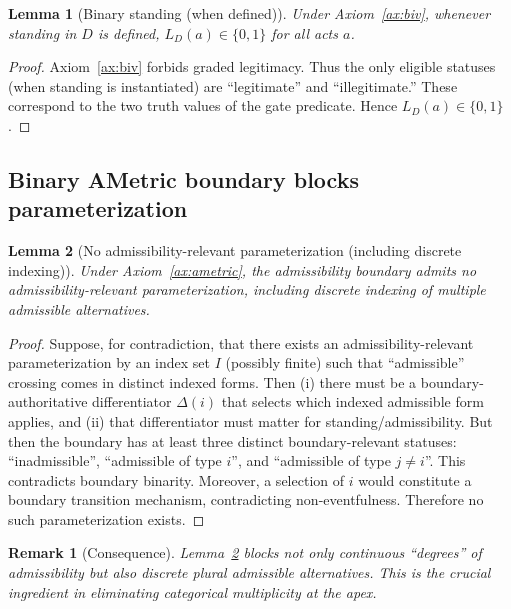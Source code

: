 \documentclass[12pt]{article}
\newtheorem{lemma}{Lemma}
\newtheorem{remark}{Remark}
\begin{document}
\begin{lemma}[Binary standing (when defined)]
\label{lem:binary-standing}
Under Axiom~\ref{ax:biv}, whenever standing in $D$ is defined, $L_D(a)\in\{0,1\}$ for all acts $a$.
\end{lemma}

\begin{proof}
Axiom~\ref{ax:biv} forbids graded legitimacy. Thus the only eligible statuses (when standing is instantiated) are ``legitimate'' and ``illegitimate.''
These correspond to the two truth values of the gate predicate. Hence $L_D(a)\in\{0,1\}$.
\end{proof}

\subsection{Binary AMetric boundary blocks parameterization}

\begin{lemma}[No admissibility-relevant parameterization (including discrete indexing)]
\label{lem:no-parameter}
Under Axiom~\ref{ax:ametric}, the admissibility boundary admits no admissibility-relevant parameterization, including discrete indexing of multiple admissible alternatives.
\end{lemma}

\begin{proof}
Suppose, for contradiction, that there exists an admissibility-relevant parameterization by an index set $I$ (possibly finite) such that ``admissible'' crossing
comes in distinct indexed forms. Then (i) there must be a boundary-authoritative differentiator $\Delta(i)$ that selects which indexed admissible form applies, and (ii) that differentiator must matter for standing/admissibility.
But then the boundary has at least three distinct boundary-relevant statuses: ``inadmissible'', ``admissible of type $i$'', and ``admissible of type $j\neq i$''.
This contradicts boundary binarity. Moreover, a selection of $i$ would constitute a boundary transition mechanism, contradicting non-eventfulness.
Therefore no such parameterization exists.
\end{proof}

\begin{remark}[Consequence]
Lemma~\ref{lem:no-parameter} blocks not only continuous ``degrees'' of admissibility but also discrete plural admissible alternatives.
This is the crucial ingredient in eliminating categorical multiplicity at the apex.
\end{remark}
\end{document}
